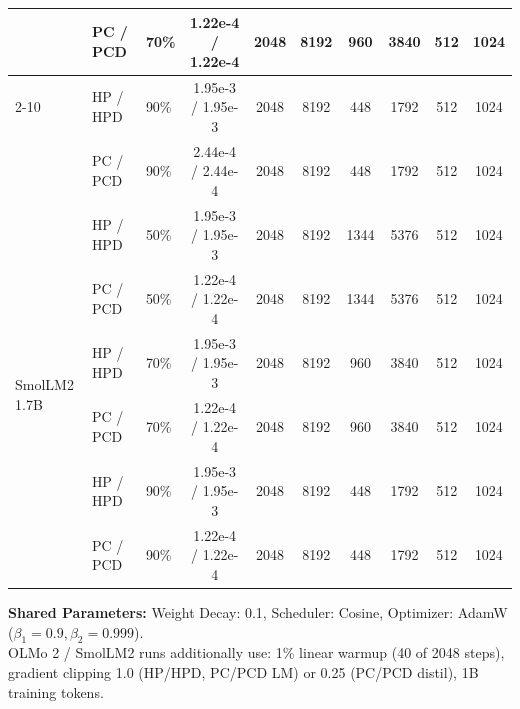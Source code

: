 \begin{table}[h!]
\begin{tabular}{lllc|cc|cc|cc}
& PC / PCD & 70\% & 1.22e-4 / 1.22e-4 & 2048 & 8192 & 960 & 3840 & 512 & 1024 \\
\cmidrule(l){2-10}
& HP / HPD & 90\% & 1.95e-3 / 1.95e-3 & 2048 & 8192 & 448 & 1792 & 512 & 1024 \\
& PC / PCD & 90\% & 2.44e-4 / 2.44e-4 & 2048 & 8192 & 448 & 1792 & 512 & 1024 \\
\midrule
\multirow{6}{*}{SmolLM2 1.7B}
& HP / HPD & 50\% & 1.95e-3 / 1.95e-3 & 2048 & 8192 & 1344 & 5376 & 512 & 1024 \\
& PC / PCD & 50\% & 1.22e-4 / 1.22e-4 & 2048 & 8192 & 1344 & 5376 & 512 & 1024 \\
\cmidrule(l){2-10}
& HP / HPD & 70\% & 1.95e-3 / 1.95e-3 & 2048 & 8192 & 960 & 3840 & 512 & 1024 \\
& PC / PCD & 70\% & 1.22e-4 / 1.22e-4 & 2048 & 8192 & 960 & 3840 & 512 & 1024 \\
\cmidrule(l){2-10}
& HP / HPD & 90\% & 1.95e-3 / 1.95e-3 & 2048 & 8192 & 448 & 1792 & 512 & 1024 \\
& PC / PCD & 90\% & 1.22e-4 / 1.22e-4 & 2048 & 8192 & 448 & 1792 & 512 & 1024 \\
\bottomrule
\end{tabular}

\vspace{2pt}
\begin{minipage}{\textwidth}
\footnotesize
\textbf{Shared Parameters:} Weight Decay: 0.1, Scheduler: Cosine, Optimizer: AdamW ($\beta_1=0.9, \beta_2=0.999$). \\
OLMo 2 / SmolLM2 runs additionally use: 1\% linear warmup (40 of 2048 steps), gradient clipping 1.0 (HP/HPD, PC/PCD LM) or 0.25 (PC/PCD distil), 1B training tokens.
\end{minipage}
\end{table}